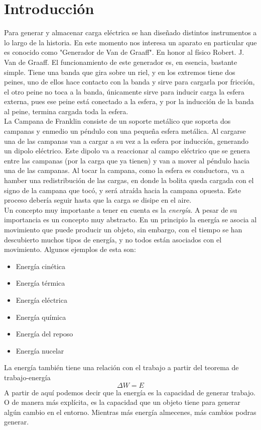 \documentclass[article,12pt]{elsarticle}
\begin{document}
\section{Introducción}
    Para generar y almacenar carga eléctrica se han diseñado distintos instrumentos a lo largo de la historia. En este momento nos interesa un aparato en particular que es conocido como "Generador de Van de Graaff". En honor al físico Robert. J. Van de Graaff. El funcionamiento de este generador es, en esencia, bastante simple. Tiene una banda que gira sobre un riel, y en los extremos tiene dos peines, uno de ellos hace contacto con la banda y sirve para cargarla por fricción, el otro peine no toca a la banda, únicamente sirve para inducir carga la esfera externa, pues ese peine está conectado a la esfera, y por la inducción de la banda al peine, termina cargada toda la esfera. \\
    La Campana de Franklin consiste de un soporte metálico que soporta dos campanas y enmedio un péndulo con una pequeña esfera metálica.
    Al cargarse una de las campanas van a cargar a su vez a la esfera por inducción, generando un dipolo eléctrico. Este dipolo va a reaccionar al campo eléctrico que se genera entre las campanas (por la carga que ya tienen) y van a mover al péndulo hacia una de las campanas. Al tocar la campana, como la esfera es conductora, va a hamber una redistribución de las cargas, en donde la bolita queda cargada con el signo de la campana que tocó, y será atraída hacia la campana opuesta. Este proceso debería seguir hasta que la carga se disipe en el aire.\\
    Un concepto muy importante a tener en cuenta es la \textit{energía}. A pesar de su importancia es un concepto muy abstracto. En un principio la energía se asocia al movimiento que puede producir un objeto, sin embargo, con el tiempo se han descubierto muchos tipos de energía, y no todos están asociados con el movimiento. Algunos ejemplos de esta son:
    \begin{itemize}
        \item Energía cinética
        \item Energía térmica
        \item Energía eléctrica
        \item Energía química
        \item Energía del reposo
        \item Energía nucelar
    \end{itemize}
    La energía también tiene una relación con el trabajo a partir del teorema de trabajo-energía
    \begin{equation}
        \Delta W=E
    \end{equation}
    A partir de aquí podemos decir que la energía es la capacidad de generar trabajo. O de manera más explícita, es la capacidad que un objeto tiene para generar algún cambio en el entorno. Mientras más energía almecenes, más cambios podras generar. \\
    
\end{document}
